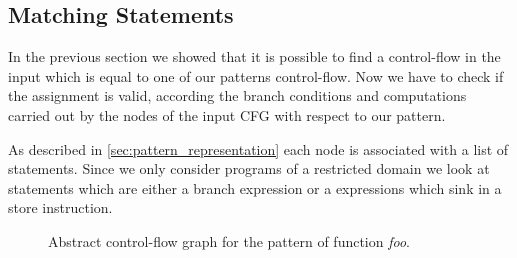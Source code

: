 
\subsection{Matching Statements}
\label{sec:matching_statements}

In the previous section we showed that it is possible to find a control-flow in the input which is equal to one of our patterns control-flow. Now we have to check if the assignment is valid, according the branch conditions and computations carried out by the nodes of the input CFG with respect to our pattern.

As described in \ref{sec:pattern_representation} each node is associated with a list of statements. Since we only consider programs of a restricted domain we look at statements which are either a branch expression or a expressions which sink in a store instruction.

\begin{figure}[htp] 
\label{fig:abstractCFGOfFoo}
\caption{Abstract control-flow graph for the pattern of function \textit{foo}.}
\end{figure}

